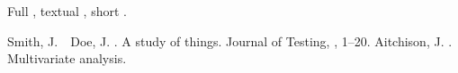 \documentclass{article}
\begin{document}
Full \cite{smith2020}, textual , short .
\begin{thebibliography}{}
Smith, J.\BBACOMMA\ \BBA\ Doe, J. \BBCP. \BBOQ A study of things\BBCQ. {\Bem Journal of Testing}, {}, 1--20.
Aitchison, J. \BBCP. {\Bem Multivariate analysis}.
\end{thebibliography}
\end{document}

